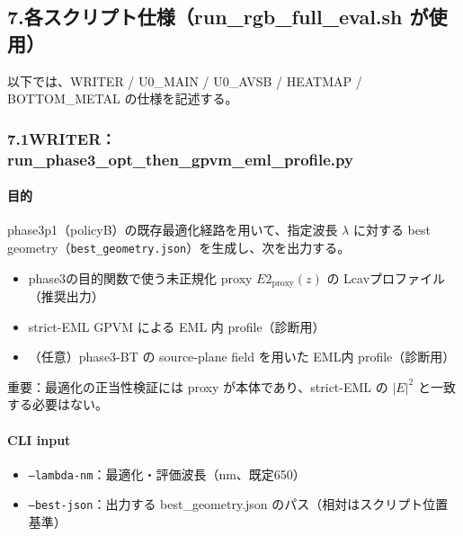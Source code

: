\documentclass[a4paper,11pt]{jsarticle} %
\begin{document}
\subsection*{7.\;各スクリプト仕様（run\_rgb\_full\_eval.sh が使用）}
以下では、WRITER / U0\_MAIN / U0\_AVSB / HEATMAP / BOTTOM\_METAL の仕様を記述する。

\subsubsection*{7.1\;WRITER：run\_phase3\_opt\_then\_gpvm\_eml\_profile.py}
\paragraph{目的}
phase3p1（policyB）の既存最適化経路を用いて、指定波長 $\lambda$ に対する best geometry（\texttt{best\_geometry.json}）を生成し、次を出力する。
\begin{itemize}
\item phase3の目的関数で使う未正規化 proxy $E2_{\mathrm{proxy}}(z)$ の Lcavプロファイル（推奨出力）
\item strict-EML GPVM による EML 内 profile（診断用）
\item （任意）phase3-BT の source-plane field を用いた EML内 profile（診断用）
\end{itemize}
重要：最適化の正当性検証には proxy が本体であり、strict-EML の $|E|^2$ と一致する必要はない。

\paragraph{CLI input}
\begin{itemize}
\item \texttt{--lambda-nm}：最適化・評価波長（nm、既定650）
\item \texttt{--best-json}：出力する best\_geometry.json のパス（相対はスクリプト位置基準）
\end{itemize}
\end{document}
